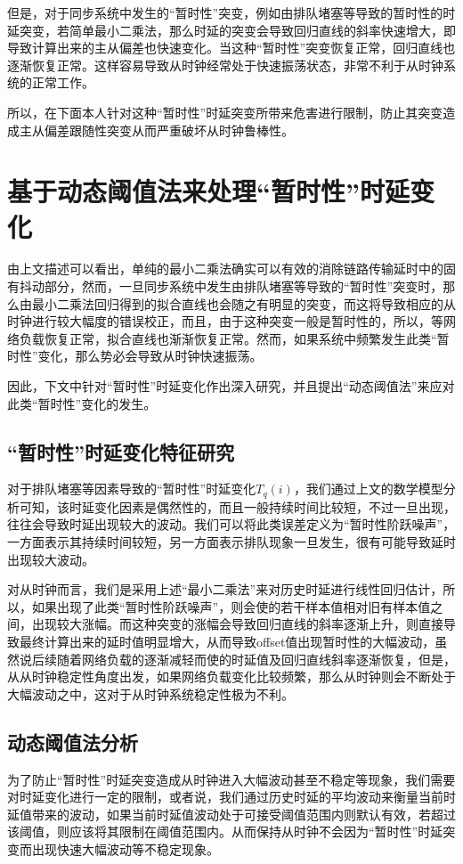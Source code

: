 但是，对于同步系统中发生的“暂时性”突变，例如由排队堵塞等导致的暂时性的时延突变，若简单最小二乘法，那么时延的突变会导致回归直线的斜率快速增大，即导致计算出来的主从偏差也快速变化。当这种“暂时性”突变恢复正常，回归直线也逐渐恢复正常。这样容易导致从时钟经常处于快速振荡状态，非常不利于从时钟系统的正常工作。

所以，在下面本人针对这种“暂时性”时延突变所带来危害进行限制，防止其突变造成主从偏差跟随性突变从而严重破坏从时钟鲁棒性。

\section{基于动态阈值法来处理“暂时性”时延变化}
由上文描述可以看出，单纯的最小二乘法确实可以有效的消除链路传输延时中的固有抖动部分，然而，一旦同步系统中发生由排队堵塞等导致的“暂时性”突变时，那么由最小二乘法回归得到的拟合直线也会随之有明显的突变，而这将导致相应的从时钟进行较大幅度的错误校正，而且，由于这种突变一般是暂时性的，所以，等网络负载恢复正常，拟合直线也渐渐恢复正常。然而，如果系统中频繁发生此类“暂时性”变化，那么势必会导致从时钟快速振荡。

因此，下文中针对“暂时性”时延变化作出深入研究，并且提出“动态阈值法”来应对此类“暂时性”变化的发生。

\subsection{“暂时性”时延变化特征研究}
对于排队堵塞等因素导致的“暂时性”时延变化$T_{q}(i)$，我们通过上文的数学模型分析可知，该时延变化因素是偶然性的，而且一般持续时间比较短，不过一旦出现，往往会导致时延出现较大的波动。我们可以将此类误差定义为“暂时性阶跃噪声”，一方面表示其持续时间较短，另一方面表示排队现象一旦发生，很有可能导致延时出现较大波动。

对从时钟而言，我们是采用上述“最小二乘法”来对历史时延进行线性回归估计，所以，如果出现了此类“暂时性阶跃噪声”，则会使的若干样本值相对旧有样本值之间，出现较大涨幅。而这种突变的涨幅会导致回归直线的斜率逐渐上升，则直接导致最终计算出来的延时值明显增大，从而导致offset值出现暂时性的大幅波动，虽然说后续随着网络负载的逐渐减轻而使的时延值及回归直线斜率逐渐恢复，但是，从从时钟稳定性角度出发，如果网络负载变化比较频繁，那么从时钟则会不断处于大幅波动之中，这对于从时钟系统稳定性极为不利。

\subsection{动态阈值法分析}
为了防止“暂时性”时延突变造成从时钟进入大幅波动甚至不稳定等现象，我们需要对时延变化进行一定的限制，或者说，我们通过历史时延的平均波动来衡量当前时延值带来的波动，如果当前时延值波动处于可接受阈值范围内则默认有效，若超过该阈值，则应该将其限制在阈值范围内。从而保持从时钟不会因为“暂时性”时延突变而出现快速大幅波动等不稳定现象。

